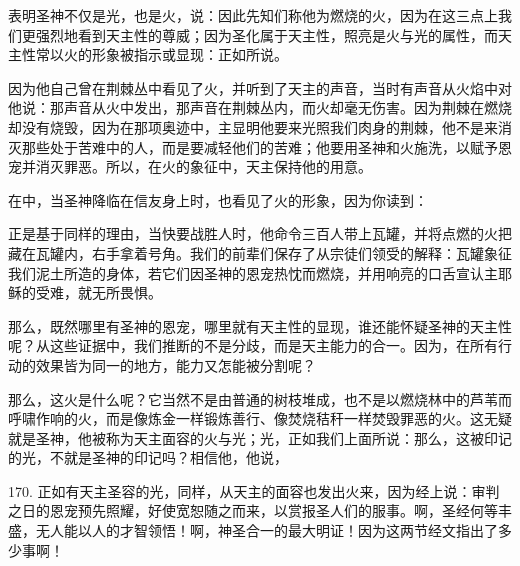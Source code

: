 表明圣神不仅是光，也是火，说：因此先知们称他为燃烧的火，因为在这三点上我们更强烈地看到天主性的尊威；因为圣化属于天主性，照亮是火与光的属性，而天主性常以火的形象被指示或显现：正如所说。\par

因为他自己曾在荆棘丛中看见了火，并听到了天主的声音，当时有声音从火焰中对他说：那声音从火中发出，那声音在荆棘丛内，而火却毫无伤害。因为荆棘在燃烧却没有烧毁，因为在那项奥迹中，主显明他要来光照我们肉身的荆棘，他不是来消灭那些处于苦难中的人，而是要减轻他们的苦难；他要用圣神和火施洗，以赋予恩宠并消灭罪恶。所以，在火的象征中，天主保持他的用意。\par

在中，当圣神降临在信友身上时，也看见了火的形象，因为你读到：\par

正是基于同样的理由，当快要战胜人时，他命令三百人带上瓦罐，并将点燃的火把藏在瓦罐内，右手拿着号角。我们的前辈们保存了从宗徒们领受的解释：瓦罐象征我们泥土所造的身体，若它们因圣神的恩宠热忱而燃烧，并用响亮的口舌宣认主耶稣的受难，就无所畏惧。\par

那么，既然哪里有圣神的恩宠，哪里就有天主性的显现，谁还能怀疑圣神的天主性呢？从这些证据中，我们推断的不是分歧，而是天主能力的合一。因为，在所有行动的效果皆为同一的地方，能力又怎能被分割呢？\par

那么，这火是什么呢？它当然不是由普通的树枝堆成，也不是以燃烧林中的芦苇而呼啸作响的火，而是像炼金一样锻炼善行、像焚烧秸秆一样焚毁罪恶的火。这无疑就是圣神，他被称为天主面容的火与光；光，正如我们上面所说：那么，这被印记的光，不就是圣神的印记吗？相信他，他说，\par

170. 正如有天主圣容的光，同样，从天主的面容也发出火来，因为经上说：审判之日的恩宠预先照耀，好使宽恕随之而来，以赏报圣人们的服事。啊，圣经何等丰盛，无人能以人的才智领悟！啊，神圣合一的最大明证！因为这两节经文指出了多少事啊！\par


